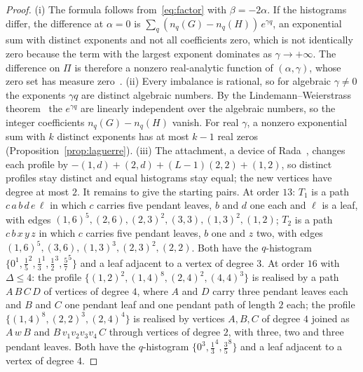 \documentclass[a5paper, 10pt]{article}
\theoremstyle{plain}
\theoremstyle{remark}
\theoremstyle{definition}
\begin{document}
  \begin{proof}
  (i) The formula follows from~\eqref{eq:factor} with $\beta = -2\alpha$.
  If the histograms differ, the difference at $\alpha = 0$ is
  $\sum_q (n_q(G) - n_q(H))\,e^{\gamma q}$, an exponential sum with
  distinct exponents and not all coefficients zero, which is not
  identically zero because the term with the largest exponent dominates
  as $\gamma \to +\infty$. The difference on $\Pi$ is therefore a nonzero
  real-analytic function of $(\alpha,\gamma)$, whose zero set has
  measure zero~\cite{Mityagin2020}.
  (ii) Every imbalance is rational, so for algebraic $\gamma \neq 0$ the
  exponents $\gamma q$ are distinct algebraic numbers. By the
  Lindemann--Weierstrass theorem~\cite{Baker1975} the $e^{\gamma q}$ are
  linearly independent over the algebraic numbers, so the integer
  coefficients $n_q(G) - n_q(H)$ vanish. For real $\gamma$, a nonzero
  exponential sum with $k$ distinct exponents has at most $k - 1$ real
  zeros (Proposition~\ref{prop:laguerre}).
  (iii) The attachment, a device of Rada~\cite{Rada2026LinearVDB},
  changes each profile by $-(1,d) + (2,d) + (L-1)(2,2) + (1,2)$, so
  distinct profiles stay distinct and equal histograms stay equal; the
  new vertices have degree at most $2$. It remains to give the starting
  pairs. At order $13$: $T_1$ is a path $c\,a\,b\,d\,e\,\ell$ in which $c$
  carries five pendant leaves, $b$ and $d$ one each and $\ell$ is a leaf,
  with edges $(1,6)^{5}, (2,6), (2,3)^{2}, (3,3), (1,3)^{2}, (1,2)$;
  $T_2$ is a path $c\,b\,x\,y\,z$ in which $c$ carries five pendant
  leaves, $b$ one and $z$ two, with edges
  $(1,6)^{5}, (3,6), (1,3)^{3}, (2,3)^{2}, (2,2)$. Both have the
  $q$-histogram $\{0^{1}, \tfrac15^{2}, \tfrac13^{1}, \tfrac12^{3}, \tfrac57^{5}\}$
  and a leaf adjacent to a vertex of degree $3$. At order $16$ with
  $\Delta \le 4$: the profile
  $\{(1,2)^{2}, (1,4)^{8}, (2,4)^{2}, (4,4)^{3}\}$ is realised by a path
  $A\,B\,C\,D$ of vertices of degree $4$, where $A$ and $D$ carry three
  pendant leaves each and $B$ and $C$ one pendant leaf and one pendant
  path of length $2$ each; the profile
  $\{(1,4)^{8}, (2,2)^{3}, (2,4)^{4}\}$ is realised by vertices $A, B, C$
  of degree $4$ joined as $A\,w\,B$ and $B\,v_1 v_2 v_3 v_4\,C$ through
  vertices of degree $2$, with three, two and three pendant leaves. Both
  have the $q$-histogram $\{0^{3}, \tfrac13^{4}, \tfrac35^{8}\}$ and a
  leaf adjacent to a vertex of degree $4$.
  \end{proof}
\end{document}
